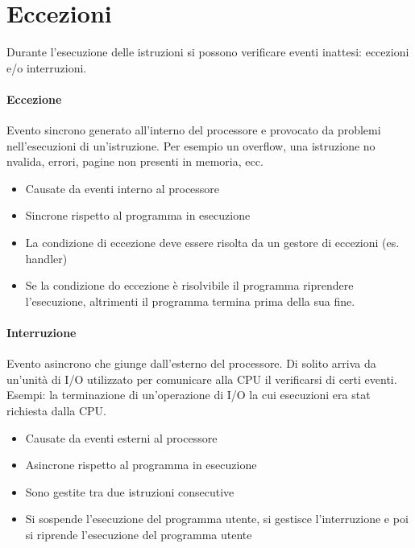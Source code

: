 \documentclass[12pt, a4paper, openany]{book}
\begin{document}

\section{Eccezioni}
Durante l'esecuzione delle istruzioni si possono verificare eventi inattesi: eccezioni
e/o interruzioni.
\paragraph*{Eccezione} Evento sincrono generato all'interno del processore e provocato
da problemi nell'esecuzioni di un'istruzione. Per esempio un overflow, una istruzione
no nvalida, errori, pagine non presenti in memoria, ecc.
\begin{itemize}
    \item Causate da eventi interno al processore
    \item Sincrone rispetto al programma in esecuzione
    \item La condizione di eccezione deve essere risolta da un gestore di eccezioni (es. handler)
    \item Se la condizione do eccezione è risolvibile il programma riprendere l'esecuzione, altrimenti
    il programma termina prima della sua fine.
\end{itemize}

\paragraph*{Interruzione} Evento asincrono che giunge dall'esterno del processore.
Di solito arriva da un'unità di I/O utilizzato per comunicare alla CPU il verificarsi
di certi eventi.
Esempi: la terminazione di un'operazione di I/O la cui esecuzioni era stat richiesta dalla
CPU.
\begin{itemize}
    \item Causate da eventi esterni al processore
    \item Asincrone rispetto al programma in esecuzione
    \item Sono gestite tra due istruzioni consecutive
    \item Si sospende l'esecuzione del programma utente, si gestisce l'interruzione e poi
    si riprende l'esecuzione del programma utente
\end{itemize}
\end{document}
